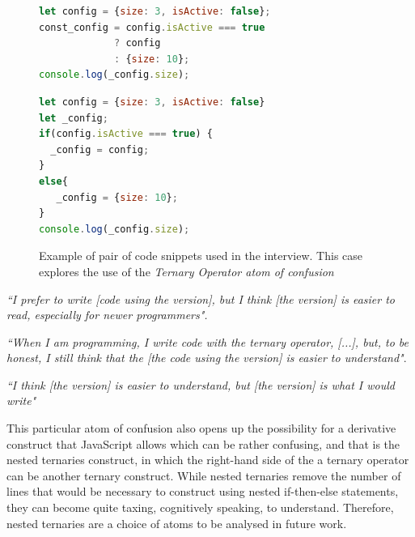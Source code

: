 \begin{figure}

\noindent\begin{minipage}{.45\textwidth}
\begin{lstlisting}[language=JavaScript, caption=\emph{Left-hand side} (using the \emph{Ternary Operator} atom)]
let config = {size: 3, isActive: false};
const_config = config.isActive === true 
             ? config 
             : {size: 10};
console.log(_config.size);
\end{lstlisting}
\end{minipage}\hfill
\begin{minipage}{.45\textwidth}
\begin{lstlisting}[language=JavaScript, caption=\emph{Right-hand side} (without the atom)]
let config = {size: 3, isActive: false}
let _config;
if(config.isActive === true) {
  _config = config;
}
else{
   _config = {size: 10};
}
console.log(_config.size);
\end{lstlisting}
\end{minipage}
\caption{Example of pair of code snippets used in the interview. This case explores the use of the \emph{Ternary Operator atom of confusion}}
\label{code:ternary}
\end{figure}

\begin{mq}
\emph{``I prefer to write [code using the \lhs version], but I think [the \rhs version]  is easier to read, especially for newer programmers".}
\end{mq}

\begin{mq}
\emph{``When I am programming, I write code with the ternary operator, [...], but, to be honest, I still think that the [the code using the \lhs version] is easier to understand"}.
\end{mq}

\begin{mq}
\emph{``I think [the \lhs version] is easier to understand, but [the \rhs version] is what I would write"}
\end{mq}

This particular atom of confusion also opens up the possibility for a derivative construct that JavaScript allows which can be rather confusing, and that is the nested ternaries construct, in which the right-hand side of the a ternary operator can be another ternary construct. While nested ternaries remove the number of lines that would be necessary to construct using nested if-then-else statements, they can become quite taxing, cognitively speaking, to understand. Therefore, nested ternaries are a choice of atoms to be analysed in future work.

